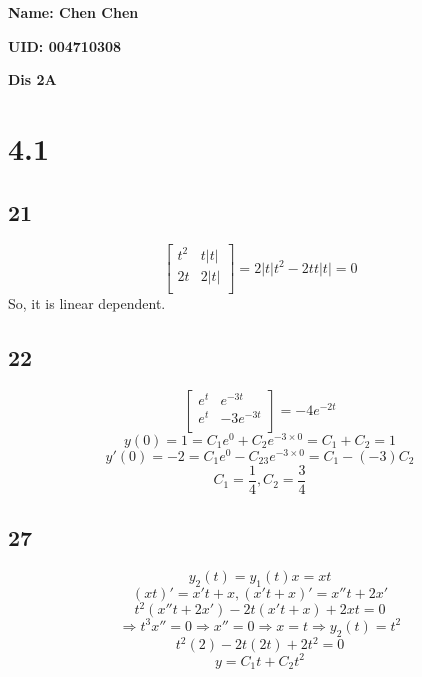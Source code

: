 \documentclass[12pt, a4paper]{IEEEtran}
\begin{document}
    \centerline{\textbf{Name: Chen Chen}}
    \centerline{\textbf{UID: 004710308}}
    \centerline{\textbf{Dis 2A}}

    \section*{4.1}
    \subsection*{21}
    $$\left[
        \begin{matrix}
            t^2&t|t|\\
            2t&2|t|\\
        \end{matrix}
        \right]
    =2|t|t^2-2tt|t|=0$$
    So, it is linear dependent.

    \subsection*{22}
    
    $$\left[
        \begin{matrix}
            e^t&e^{-3t}\\
            e^t&-3e^{-3t}\\
        \end{matrix}
        \right]
    =-4e^{-2t}$$
    $$y(0)=1=C_1e^0+C_2e^{-3\times 0}=C_1+C_2=1$$
    $$y'(0)=-2=C_1e^0-C_23e^{-3\times 0}=C_1-(-3)C_2$$
    $$C_1=\frac{1}{4}, C_2=\frac{3}{4}$$

    \subsection*{27}
    $$y_2(t)=y_1(t)x=xt$$
    $$(xt)'=x't+x, (x't+x)'=x''t+2x'$$
    $$t^2(x''t+2x')-2t(x't+x)+2xt=0$$
    $$\Rightarrow t^3x''=0 \Rightarrow x''=0\Rightarrow x=t\Rightarrow y_2(t)=t^2$$
    $$t^2(2)-2t(2t)+2t^2=0$$
    $$y=C_1t+C_2t^2$$
    
    

    
\end{document}
